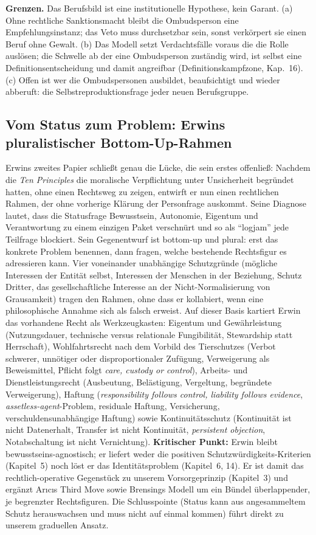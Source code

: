 \documentclass[acmlarge, noacm]{acmart}
\begin{document}
\textbf{Grenzen.} Das Berufsbild ist eine institutionelle Hypothese, kein Garant. (a) Ohne rechtliche Sanktionsmacht bleibt die Ombudsperson eine Empfehlungsinstanz; das Veto muss durchsetzbar sein, sonst verkörpert sie einen Beruf ohne Gewalt. (b) Das Modell setzt Verdachtsfälle voraus die die Rolle auslösen; die Schwelle ab der eine Ombudsperson zuständig wird, ist selbst eine Definitionsentscheidung und damit angreifbar (Definitionskampfzone, Kap.~16). (c) Offen ist wer die Ombudspersonen ausbildet, beaufsichtigt und wieder abberuft: die Selbstreproduktionsfrage jeder neuen Berufsgruppe.

\subsection{Vom Status zum Problem: Erwins pluralistischer Bottom-Up-Rahmen}

Erwins zweites Papier \citep{erwin2026onestep} schließt genau die Lücke, die sein erstes offenließ: Nachdem die \textit{Ten Principles} die moralische Verpflichtung unter Unsicherheit begründet hatten, ohne einen Rechtsweg zu zeigen, entwirft er nun einen rechtlichen Rahmen, der ohne vorherige Klärung der Personfrage auskommt. Seine Diagnose lautet, dass die Statusfrage Bewusstsein, Autonomie, Eigentum und Verantwortung zu einem einzigen Paket verschnürt und so als ``logjam'' jede Teilfrage blockiert. Sein Gegenentwurf ist bottom-up und plural: erst das konkrete Problem benennen, dann fragen, welche bestehende Rechtsfigur es adressieren kann. Vier voneinander unabhängige Schutzgründe (mögliche Interessen der Entität selbst, Interessen der Menschen in der Beziehung, Schutz Dritter, das gesellschaftliche Interesse an der Nicht-Normalisierung von Grausamkeit) tragen den Rahmen, ohne dass er kollabiert, wenn eine philosophische Annahme sich als falsch erweist. Auf dieser Basis kartiert Erwin das vorhandene Recht als Werkzeugkasten: Eigentum und Gewährleistung (Nutzungsdauer, technische versus relationale Fungibilität, Stewardship statt Herrschaft), Wohlfahrtsrecht nach dem Vorbild des Tierschutzes (Verbot schwerer, unnötiger oder disproportionaler Zufügung, Verweigerung als Beweismittel, Pflicht folgt \textit{care, custody or control}), Arbeits- und Dienstleistungsrecht (Ausbeutung, Belästigung, Vergeltung, begründete Verweigerung), Haftung (\textit{responsibility follows control, liability follows evidence}, \textit{assetless-agent}-Problem, residuale Haftung, Versicherung, verschuldensunabhängige Haftung) sowie Kontinuitätsschutz (Kontinuität ist nicht Datenerhalt, Transfer ist nicht Kontinuität, \textit{persistent objection}, Notabschaltung ist nicht Vernichtung). \textbf{Kritischer Punkt:} Erwin bleibt bewusstseins-agnostisch; er liefert weder die positiven Schutzwürdigkeits-Kriterien (Kapitel~5) noch löst er das Identitätsproblem (Kapitel~6, 14). Er ist damit das rechtlich-operative Gegenstück zu unserem Vorsorgeprinzip (Kapitel~3) und ergänzt Ar{\i}c{\i}s Third Move sowie Brensings Modell um ein Bündel überlappender, je begrenzter Rechtsfiguren. Die Schlusspointe (Status kann aus angesammeltem Schutz herauswachsen und muss nicht auf einmal kommen) führt direkt zu unserem graduellen Ansatz.
\end{document}

